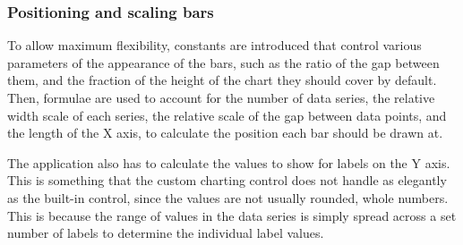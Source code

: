 	\subsubsection{Positioning and scaling bars}
	To allow maximum flexibility, constants are introduced that control various parameters of the appearance of the bars, such as the ratio of the gap between them, and the fraction of the height of the chart they should cover by default. Then, formulae are used to account for the number of data series, the relative width scale of each series, the relative scale of the gap between data points, and the length of the X axis, to calculate the position each bar should be drawn at.
	
	The application also has to calculate the values to show for labels on the Y axis. This is something that the custom charting control does not handle as elegantly as the built-in control, since the values are not usually rounded, whole numbers. This is because the range of values in the data series is simply spread across a set number of labels to determine the individual label values.
